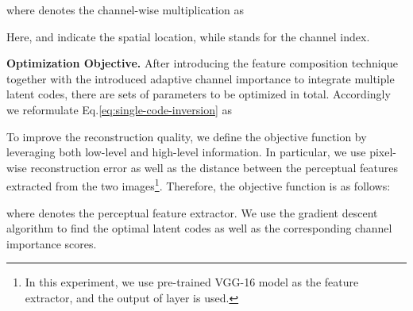 \documentclass[10pt,twocolumn,letterpaper]{article}
\begin{document}
where  denotes the channel-wise multiplication as

Here,  and  indicate the spatial location, while  stands for the channel index.


\vspace{2pt}\noindent\textbf{Optimization Objective.}
After introducing the feature composition technique together with the introduced adaptive channel importance to integrate multiple latent codes, there are  sets of parameters to be optimized in total.
Accordingly we reformulate Eq.\eqref{eq:single-code-inversion} as

To improve the reconstruction quality, we define the objective function by leveraging both low-level and high-level information.
In particular, we use pixel-wise reconstruction error as well as the  distance between the perceptual features \cite{johnson2016perceptual} extracted from the two images\footnote{In this experiment, we use pre-trained VGG-16 model \cite{vgg} as the feature extractor, and the output of layer  is used.}.
Therefore, the objective function is as follows:

where  denotes the perceptual feature extractor.
We use the gradient descent algorithm to find the optimal latent codes as well as the corresponding channel importance scores.
\end{document}
